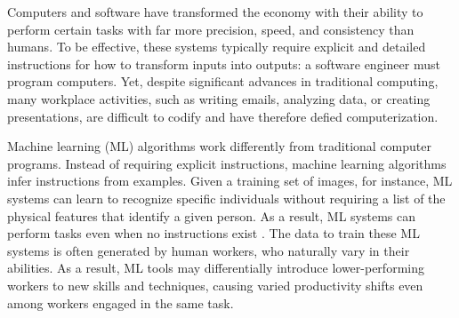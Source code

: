 \documentclass[11pt]{article}
\begin{document}

Computers and software have transformed the economy with their ability to perform certain tasks with far more precision, speed, and consistency than humans.  To be effective, these systems typically require explicit and detailed instructions for how to transform inputs into outputs: a software engineer must program computers.  Yet, despite significant advances in traditional computing, many workplace activities, such as writing emails, analyzing data, or creating presentations, are difficult to codify and have therefore defied computerization.

Machine learning (ML) algorithms work differently from traditional computer programs. Instead of requiring explicit instructions, machine learning algorithms infer instructions from examples. Given a training set of images, for instance, ML systems can learn to recognize specific individuals without requiring a list of the physical features that identify a given person. As a result, ML systems can perform tasks even when no instructions exist \citep{polanyi_tacit_1966, autorPolanyiParadoxShape2014, brynjolfssonmitchell2017}. The data to train these ML systems is often generated by human workers, who naturally vary in their abilities. As a result, ML tools may differentially introduce lower-performing workers to new skills and techniques, causing varied productivity shifts even among workers engaged in the same task.
\end{document}

